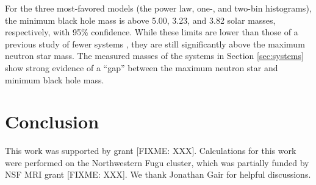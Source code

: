 \documentclass[preprint]{aastex}
\newcommand{\fixme}[1]{[FIXME: #1]}
\begin{document}
For the three most-favored models (the power law, one-, and two-bin
histograms), the minimum black hole mass is above 5.00, 3.23, and 3.82
solar masses, respectively, with 95\% confidence.  While these limits
are lower than those of a previous study of fewer systems
\citep{Bailyn1998}, they are still significantly above the maximum
neutron star mass.  The measured masses of the systems in Section
\ref{sec:systems} show strong evidence of a ``gap'' between the
maximum neutron star and minimum black hole mass.

\section{Conclusion}

\acknowledgements

This work was supported by grant \fixme{XXX}.  Calculations for this
work were performed on the Northwestern Fugu cluster, which was
partially funded by NSF MRI grant \fixme{XXX}.  We thank Jonathan Gair
for helpful discussions.


\end{document}
